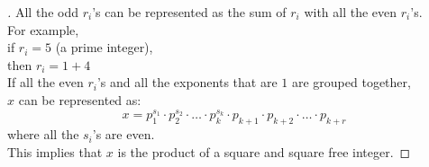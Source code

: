 \documentclass[paper=usletter, fontsize=12pt]{article}
\begin{document}
\begin{itemize}
\begin{itemize}
\begin{proof}[\unskip\nopunct]
                All the odd $r_i$'s can be represented as the sum of $r_i$ with all the even $r_i$'s.\\
                For example,\\
                if $r_i = 5$ (a prime integer),\\
                then $r_i = 1 + 4$\\

                If all the even $r_i$'s and all the exponents that are $1$ are grouped together,\\
                $x$ can be represented as:
                \begin{equation*}
                    x = p_{1}^{s_1} \cdot p_{2}^{s_2} \cdot \ldots \cdot p_{k}^{s_k} \cdot p_{k+1} \cdot p_{k+2} \cdot \ldots \cdot p_{k+r}
                \end{equation*}
                where all the $s_i$'s are even.\\
                This implies that $x$ is the product of a square and square free integer. \qedhere
            \end{proof}
            \vspace{0.2in}

        \end{itemize}

    \end{itemize}
\end{document}
